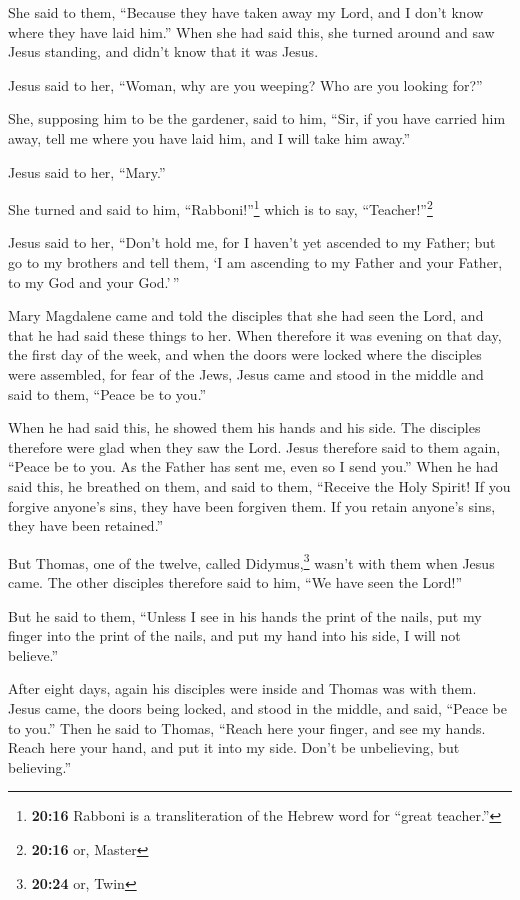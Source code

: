 She said to them, ``Because they have taken away my Lord, and I don't
know where they have laid him.''  When she had said this,
she turned around and saw Jesus standing, and didn't know that it was
Jesus.

 Jesus said to her, ``Woman, why are you weeping? Who are
you looking for?''

She, supposing him to be the gardener, said to him, ``Sir, if you have
carried him away, tell me where you have laid him, and I will take him
away.''

 Jesus said to her, ``Mary.''

She turned and said to him, ``Rabboni!''\footnote{\textbf{20:16} Rabboni
  is a transliteration of the Hebrew word for ``great teacher.''} which
is to say, ``Teacher!''\footnote{\textbf{20:16} or, Master}

 Jesus said to her, ``Don't hold me, for I haven't yet
ascended to my Father; but go to my brothers and tell them, `I am
ascending to my Father and your Father, to my God and your God.'\,''

 Mary Magdalene came and told the disciples that she had
seen the Lord, and that he had said these things to her. 
When therefore it was evening on that day, the first day of the week,
and when the doors were locked where the disciples were assembled, for
fear of the Jews, Jesus came and stood in the middle and said to them,
``Peace be to you.''

 When he had said this, he showed them his hands and his
side. The disciples therefore were glad when they saw the Lord.
 Jesus therefore said to them again, ``Peace be to you.
As the Father has sent me, even so I send you.''  When he
had said this, he breathed on them, and said to them, ``Receive the Holy
Spirit!  If you forgive anyone's sins, they have been
forgiven them. If you retain anyone's sins, they have been retained.''

 But Thomas, one of the twelve, called
Didymus,\footnote{\textbf{20:24} or, Twin} wasn't with them when Jesus
came.  The other disciples therefore said to him, ``We
have seen the Lord!''

But he said to them, ``Unless I see in his hands the print of the nails,
put my finger into the print of the nails, and put my hand into his
side, I will not believe.''

 After eight days, again his disciples were inside and
Thomas was with them. Jesus came, the doors being locked, and stood in
the middle, and said, ``Peace be to you.''  Then he said
to Thomas, ``Reach here your finger, and see my hands. Reach here your
hand, and put it into my side. Don't be unbelieving, but believing.''

